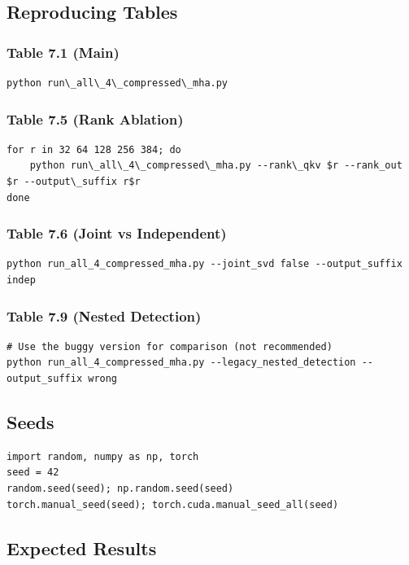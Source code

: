 \subsection{Reproducing Tables}

\subsubsection{Table 7.1 (Main)}
\begin{lstlisting}
python run\_all\_4\_compressed\_mha.py
\end{lstlisting}

\subsubsection{Table 7.5 (Rank Ablation)}
\begin{lstlisting}
for r in 32 64 128 256 384; do
    python run\_all\_4\_compressed\_mha.py --rank\_qkv $r --rank_out $r --output\_suffix r$r
done
\end{lstlisting}

\subsubsection{Table 7.6 (Joint vs Independent)}
\begin{lstlisting}
python run_all_4_compressed_mha.py --joint_svd false --output_suffix indep
\end{lstlisting}

\subsubsection{Table 7.9 (Nested Detection)}
\begin{lstlisting}
# Use the buggy version for comparison (not recommended)
python run_all_4_compressed_mha.py --legacy_nested_detection --output_suffix wrong
\end{lstlisting}

\subsection{Seeds}

\begin{lstlisting}
import random, numpy as np, torch
seed = 42
random.seed(seed); np.random.seed(seed)
torch.manual_seed(seed); torch.cuda.manual_seed_all(seed)
\end{lstlisting}

\subsection{Expected Results}


